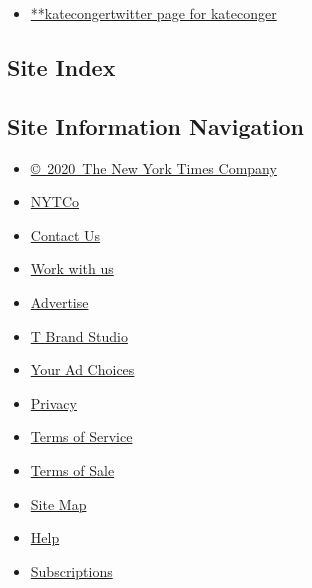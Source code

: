 \begin{itemize}
\tightlist
\item
  \href{https://twitter.com/kateconger}{**katecongertwitter page for
  kateconger}
\end{itemize}

\hypertarget{site-index}{%
\subsection{Site Index}\label{site-index}}

\hypertarget{site-information-navigation}{%
\subsection{Site Information
Navigation}\label{site-information-navigation}}

\begin{itemize}
\tightlist
\item
  \href{https://help.nytimes.com/hc/en-us/articles/115014792127-Copyright-notice}{©~2020~The
  New York Times Company}
\end{itemize}

\begin{itemize}
\tightlist
\item
  \href{https://www.nytco.com/}{NYTCo}
\item
  \href{https://help.nytimes.com/hc/en-us/articles/115015385887-Contact-Us}{Contact
  Us}
\item
  \href{https://www.nytco.com/careers/}{Work with us}
\item
  \href{https://nytmediakit.com/}{Advertise}
\item
  \href{http://www.tbrandstudio.com/}{T Brand Studio}
\item
  \href{https://www.nytimes.com/privacy/cookie-policy\#how-do-i-manage-trackers}{Your
  Ad Choices}
\item
  \href{https://www.nytimes.com/privacy}{Privacy}
\item
  \href{https://help.nytimes.com/hc/en-us/articles/115014893428-Terms-of-service}{Terms
  of Service}
\item
  \href{https://help.nytimes.com/hc/en-us/articles/115014893968-Terms-of-sale}{Terms
  of Sale}
\item
  \href{https://spiderbites.nytimes.com}{Site Map}
\item
  \href{https://help.nytimes.com/hc/en-us}{Help}
\item
  \href{https://www.nytimes.com/subscription?campaignId=37WXW}{Subscriptions}
\end{itemize}
